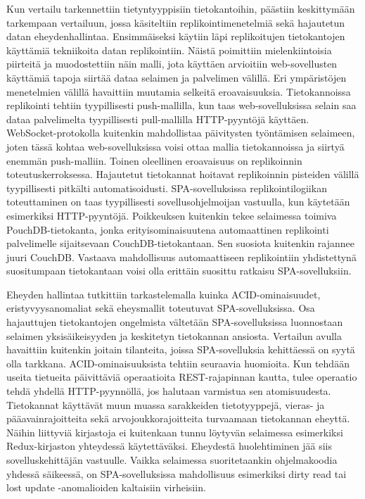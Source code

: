\documentclass[finnish,twoside,censored,csm,sw-track-2018]{HYthesisML}
\begin{document}
Kun vertailu tarkennettiin tietyntyyppisiin tietokantoihin, päästiin keskittymään tarkempaan vertailuun, jossa käsiteltiin replikointimenetelmiä sekä hajautetun datan eheydenhallintaa. Ensimmäiseksi käytiin läpi replikoitujen tietokantojen käyttämiä tekniikoita datan replikointiin. Näistä poimittiin mielenkiintoisia piirteitä ja muodostettiin näin malli, jota käyttäen arvioitiin web-sovellusten käyttämiä tapoja siirtää dataa selaimen ja palvelimen välillä. Eri ympäristöjen menetelmien välillä havaittiin muutamia selkeitä eroavaisuuksia. Tietokannoissa replikointi tehtiin tyypillisesti push-mallilla, kun taas web-sovelluksissa selain saa dataa palvelimelta tyypillisesti pull-mallilla HTTP-pyyntöjä käyttäen. WebSocket-protokolla kuitenkin mahdollistaa päivitysten työntämisen selaimeen, joten tässä kohtaa web-sovelluksissa voisi ottaa mallia tietokannoissa ja siirtyä enemmän push-malliin. Toinen oleellinen eroavaisuus on replikoinnin toteutuskerroksessa. Hajautetut tietokannat hoitavat replikoinnin pisteiden välillä tyypillisesti pitkälti automatisoidusti. SPA-sovelluksissa replikointilogiikan toteuttaminen on taas tyypillisesti sovellusohjelmoijan vastuulla, kun käytetään esimerkiksi HTTP-pyyntöjä. Poikkeuksen kuitenkin tekee selaimessa toimiva PouchDB-tietokanta, jonka erityisominaisuutena automaattinen replikointi palvelimelle sijaitsevaan CouchDB-tietokantaan. Sen suosiota kuitenkin rajannee juuri CouchDB. Vastaava mahdollisuus automaattiseen replikointiin yhdistettynä suositumpaan tietokantaan voisi olla erittäin suosittu ratkaisu SPA-sovelluksiin.

Eheyden hallintaa tutkittiin tarkastelemalla kuinka ACID-ominaisuudet, eristyvyysanomaliat sekä eheysmallit toteutuvat SPA-sovelluksissa. Osa hajauttujen tietokantojen ongelmista vältetään SPA-sovelluksissa luonnostaan selaimen yksisäikeisyyden ja keskitetyn tietokannan ansiosta. Vertailun avulla havaittiin kuitenkin joitain tilanteita, joissa SPA-sovelluksia kehittäessä on syytä olla tarkkana. ACID-ominaisuuksista tehtiin seuraavia huomioita. Kun tehdään useita tietueita päivittäviä operaatioita REST-rajapinnan kautta, tulee operaatio tehdä yhdellä HTTP-pyynnöllä, jos halutaan varmistua sen atomisuudesta. Tietokannat käyttävät muun muassa sarakkeiden tietotyyppejä, vieras- ja pääavainrajoitteita sekä arvojoukkorajoitteita turvaamaan tietokannan eheyttä. Näihin liittyviä kirjastoja ei kuitenkaan tunnu löytyvän selaimessa esimerkiksi Redux-kirjaston yhteydessä käytettäväksi. Eheydestä huolehtiminen jää siis sovelluskehittäjän vastuulle. Vaikka selaimessa suoritetaankin ohjelmakoodia yhdessä säikeessä, on SPA-sovelluksissa mahdollisuus esimerkiksi dirty read tai lost update -anomalioiden kaltaisiin virheisiin. 
\end{document}
